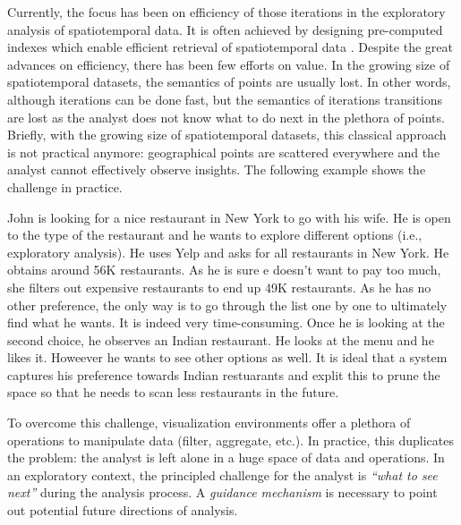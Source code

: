 Currently, the focus has been on efficiency of those iterations in the exploratory analysis of spatiotemporal data. It is often achieved by designing pre-computed indexes which enable efficient retrieval of spatiotemporal data \cite{lins2013nanocubes}. Despite the great advances on efficiency, there has been few efforts on value. In the growing size of spatiotemporal datasets, the semantics of points are usually lost. In other words, although iterations can be done fast, but the semantics of iterations transitions are lost as the analyst does not know what to do next in the plethora of points. Briefly, with the growing size of spatiotemporal datasets, this classical approach is not practical anymore: geographical points are scattered everywhere and the analyst cannot effectively observe insights. The following example shows the challenge in practice.

\begin{example}
\label{ex:resto}
John is looking for a nice restaurant in New York to go with his wife. He is open to the type of the restaurant and he wants to explore different options (i.e., exploratory analysis). He uses Yelp and asks for all restaurants in New York. He obtains around 56K restaurants. As he is sure e doesn't want to pay too much, she filters out expensive restaurants to end up 49K restaurants. As he has no other preference, the only way is to go through the list one by one to ultimately find what he wants. It is indeed very time-consuming. Once he is looking at the second choice, he observes an Indian restaurant. He looks at the menu and he likes it. Howeever he wants to see other options as well. It is ideal that a system captures his preference towards Indian restuarants and explit this to prune the space so that he needs to scan less restaurants in the future.
\end{example}

To overcome this challenge, visualization environments offer a plethora of operations to manipulate data (filter, aggregate, etc.). In practice, this duplicates the problem: the analyst is left alone in a huge space of data and operations. 
In an exploratory context,
the principled challenge for the analyst is {\em ``what to see next''} during the analysis process. A {\em guidance mechanism} is necessary to point out potential future directions of analysis.

